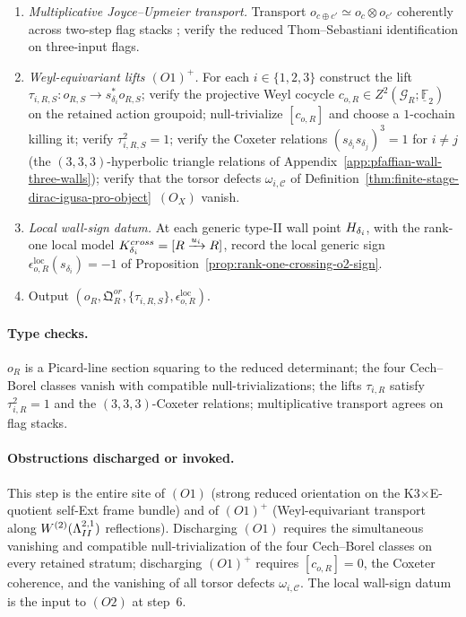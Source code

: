 \begin{enumerate}
\item \emph{Multiplicative Joyce--Upmeier transport.}  Transport
\(o_{c\oplus c'}\simeq o_c\otimes o_{c'}\) coherently across two-step
flag stacks
\cite{JoyceUpmeier,JoyceTanakaUpmeier}; verify the reduced
Thom--Sebastiani identification on three-input flags.

\item \emph{Weyl-equivariant lifts \((O1)^+\).}  For each
\(i\in\{1,2,3\}\) construct the lift
\(\tau_{i,R,S}:o_{R,S}\to s_{\delta_i}^*o_{R,S}\); verify the
projective Weyl cocycle
\(c_{o,R}\in Z^2(\mathcal G_R;\underline{\mathbb F}_2)\) on the
retained action groupoid; null-trivialize \([c_{o,R}]\) and choose a
\(1\)-cochain killing it; verify \(\tau_{i,R,S}^2=1\); verify the
Coxeter relations
\((s_{\delta_i}s_{\delta_j})^3=1\) for \(i\ne j\) (the
\((3,3,3)\)-hyperbolic triangle relations of
Appendix~\ref{app:pfaffian-wall-three-walls}); verify that the torsor
defects \(\omega_{i,\mathcal C}\) of
Definition~\ref{thm:finite-stage-dirac-igusa-pro-object}~$(O_X)$ vanish.

\item \emph{Local wall-sign datum.}  At each generic type-II wall point
\(H_{\delta_i}\), with the rank-one local model
\(K_{\delta_i}^{cross}=[R\xrightarrow{u_i}R]\), record the
local generic sign \(\epsilon_{o,R}^{\mathrm{loc}}(s_{\delta_i})=-1\)
of Proposition~\ref{prop:rank-one-crossing-o2-sign}.

\item Output
\((o_R,\mathfrak Q^{or}_R,\{\tau_{i,R,S}\},\epsilon_{o,R}^{\mathrm{loc}})\).
\end{enumerate}

\paragraph{Type checks.}
\(o_R\) is a Picard-line section squaring to the reduced determinant;
the four Cech--Borel classes vanish with compatible
null-trivializations; the lifts \(\tau_{i,R}\) satisfy
\(\tau_{i,R}^2=1\) and the \((3,3,3)\)-Coxeter relations; multiplicative
transport agrees on flag stacks.

\paragraph{Obstructions discharged or invoked.}
This step is the entire site of \((O1)\) (strong reduced orientation
on the K3\(\times\)E-quotient self-Ext frame bundle) and of
\((O1)^+\) (Weyl-equivariant transport along
\(W^{(2)}(\Lambda^{2,1}_{II})\) reflections).  Discharging \((O1)\)
requires the simultaneous vanishing and compatible
null-trivialization of the four Cech--Borel classes on every retained
stratum; discharging \((O1)^+\) requires \([c_{o,R}]=0\), the
Coxeter coherence, and the vanishing of all torsor defects
\(\omega_{i,\mathcal C}\).  The local wall-sign datum is the input to
\((O2)\) at step~6.

